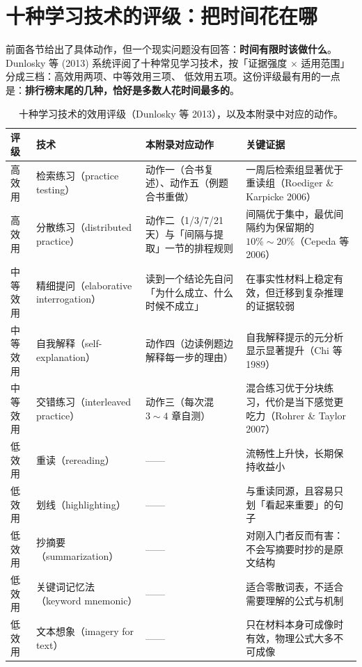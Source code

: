 \section{十种学习技术的评级：把时间花在哪}
\label{sec:app-i-dunlosky}

前面各节给出了具体动作，但一个现实问题没有回答：\textbf{时间有限时该做什么}。Dunlosky 等 (2013)
系统评阅了十种常见学习技术，按「证据强度 $\times$ 适用范围」分成三档：高效用两项、中等效用三项、
低效用五项。这份评级最有用的一点是：\textbf{排行榜末尾的几种，恰好是多数人花时间最多的}。

\begin{table}[htbp]
  \centering
  \caption{十种学习技术的效用评级（Dunlosky 等 2013），以及本附录中对应的动作。}
  \label{tab:app-i-dunlosky}
  \begin{tabular}{@{}p{1.7cm}p{3.5cm}p{5.3cm}p{5.3cm}@{}}
    \toprule
    评级 & 技术 & 本附录对应动作 & 关键证据 \\
    \midrule
    高效用 & 检索练习（practice testing） & 动作一（合书复述）、动作五（例题合书重做） & 一周后检索组显著优于重读组（Roediger \& Karpicke 2006） \\
    高效用 & 分散练习（distributed practice） & 动作二（1/3/7/21 天）与「间隔与提取」一节的排程规则 & 间隔优于集中，最优间隔约为保留期的 $10\%\sim20\%$（Cepeda 等 2006） \\
    中等效用 & 精细提问（elaborative interrogation） & 读到一个结论先自问「为什么成立、什么时候不成立」 & 在事实性材料上稳定有效，但迁移到复杂推理的证据较弱 \\
    中等效用 & 自我解释（self-explanation） & 动作四（边读例题边解释每一步的理由） & 自我解释提示的元分析显示显著提升（Chi 等 1989） \\
    中等效用 & 交错练习（interleaved practice） & 动作三（每次混 $3\sim4$ 章自测） & 混合练习优于分块练习，代价是当下感觉更吃力（Rohrer \& Taylor 2007） \\
    低效用 & 重读（rereading） & —— & 流畅性上升快，长期保持收益小 \\
    低效用 & 划线（highlighting） & —— & 与重读同源，且容易只划「看起来重要」的句子 \\
    低效用 & 抄摘要（summarization） & —— & 对刚入门者反而有害：不会写摘要时抄的是原文结构 \\
    低效用 & 关键词记忆法（keyword mnemonic） & —— & 适合零散词表，不适合需要理解的公式与机制 \\
    低效用 & 文本想象（imagery for text） & —— & 只在材料本身可成像时有效，物理公式大多不可成像 \\
    \bottomrule
  \end{tabular}
\end{table}

